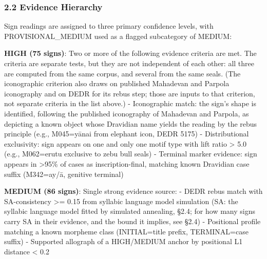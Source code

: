 \documentclass[
]{article}
\begin{document}
\subsubsection{2.2 Evidence Hierarchy}\label{evidence-hierarchy}

Sign readings are assigned to three primary confidence levels, with PROVISIONAL\_MEDIUM used as a flagged subcategory of MEDIUM:

\textbf{HIGH (75 signs)}: Two or more of the following evidence criteria are met. The criteria are separate tests, but they are not independent of each other: all three are computed from the same corpus, and several from the same seals. (The iconographic criterion also draws on published Mahadevan and Parpola iconography and on DEDR for its rebus step; those are inputs to that criterion, not separate criteria in the list above.) - Iconographic match: the sign's shape is identified, following the published iconography of Mahadevan and Parpola, as depicting a known object whose Dravidian name yields the reading by the rebus principle (e.g., M045=yānai from elephant icon, DEDR 5175) - Distributional
exclusivity: sign appears on one and only one motif type with lift ratio
\textgreater{} 5.0 (e.g., M062=erutu exclusive to zebu bull seals) -
Terminal marker evidence: sign appears in \textgreater95\% of cases as
inscription-final, matching known Dravidian case suffix (M342=ay/ā,
genitive terminal)

\textbf{MEDIUM (86 signs)}: Single strong evidence source: - DEDR rebus match with SA-consistency \textgreater{}= 0.15 from syllabic language model simulation (SA: the syllabic language model fitted by simulated annealing, §2.4; for how many signs carry SA in their evidence, and the bound it implies, see §2.4)
- Positional profile matching a known morpheme class (INITIAL=title
prefix, TERMINAL=case suffix) - Supported allograph of a HIGH/MEDIUM
anchor by positional L1 distance \textless{} 0.2
\end{document}
